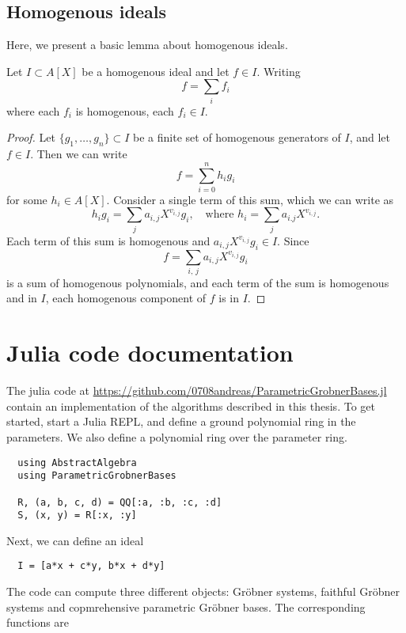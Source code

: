 \subsection{Homogenous ideals}

Here, we present a basic lemma about homogenous ideals.

\begin{lemma}\label{lem:homo_components}
  Let $I \subset A[X]$ be a homogenous ideal and let $f \in I$. Writing
  \[f = \sum_{i} f_{i}\]
  where each $f_{i}$ is homogenous, each $f_{i} \in I$.
\end{lemma}
\begin{proof}
  Let $\{g_{1}, \dots, g_{n}\} \subset I$ be a finite set of homogenous generators of $I$, and let $f \in I$. Then we can write
  \[f = \sum_{i=0}^{n} h_{i} g_{i}\]
  for some $h_{i} \in A[X]$. Consider a single term of this sum, which we can write as
  \[h_{i} g_{i} = \sum_{j} a_{i,j}X^{v_{i,j}} g_{i}, \quad \text{where } h_{i} = \sum_{j} a_{i.j}X^{v_{i,j}}.\]
  Each term of this sum is homogenous and $a_{i,j} X^{v_{i,j}} g_{i} \in I$. Since
  \[f = \sum_{i,\,j} a_{i,j} X^{v_{i, j}} g_{i}\]
  is a sum of homogenous polynomials, and each term of the sum is homogenous and in $I$, each homogenous component of $f$ is in $I$.
\end{proof}

\section{Julia code documentation}
The julia code at \url{https://github.com/0708andreas/ParametricGrobnerBases.jl} contain an implementation of the algorithms described in this thesis. To get started, start a Julia REPL, and define a ground polynomial ring in the parameters. We also define a polynomial ring over the parameter ring.

\begin{verbatim}
  using AbstractAlgebra
  using ParametricGrobnerBases

  R, (a, b, c, d) = QQ[:a, :b, :c, :d]
  S, (x, y) = R[:x, :y]
\end{verbatim}

Next, we can define an ideal

\begin{verbatim}
  I = [a*x + c*y, b*x + d*y]
\end{verbatim}

The code can compute three different objects: Gröbner systems, faithful Gröbner systems and copmrehensive parametric Gröbner bases. The corresponding functions are

